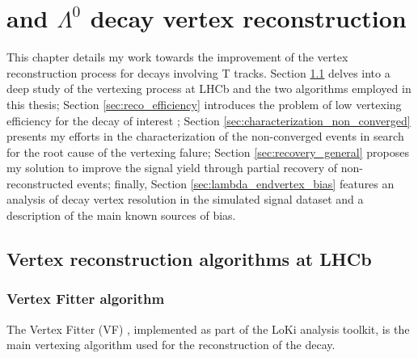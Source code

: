 \chapter{\texorpdfstring{\lbz}{Lambdab} and \texorpdfstring{$\Lambda^0$}{Lambda} decay vertex reconstruction}
\label{cap:vertex_reconstruction}
This chapter details my work towards the improvement of the vertex reconstruction process for decays involving T tracks.
Section \ref{sec:reco_algorithms} delves into a deep study of the vertexing process at LHCb and the two algorithms employed in this thesis;
Section \ref{sec:reco_efficiency} introduces the problem of low vertexing efficiency for the decay of interest \demonstratorshort;
Section \ref{sec:characterization_non_converged} presents my efforts in the characterization of the non-converged events in search for the root cause of the vertexing falure;
Section \ref{sec:recovery_general} proposes my solution to improve the signal yield through partial recovery of non-reconstructed events;
finally, Section \ref{sec:lambda_endvertex_bias} features an analysis of \lambdadecay decay vertex resolution in the simulated signal dataset and a description of the main known sources of bias.

\section{Vertex reconstruction algorithms at LHCb}
\label{sec:reco_algorithms}

\subsection{Vertex Fitter algorithm}
The Vertex Fitter (VF) \cite{twiki_vf}, implemented as part of the LoKi analysis toolkit, is the main vertexing algorithm used for the reconstruction of the \lbz decay.


